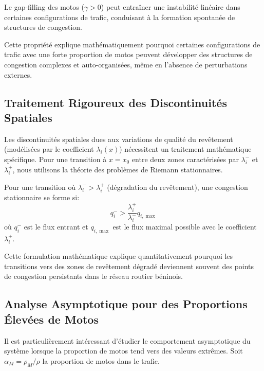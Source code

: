 \begin{proposition}
Le gap-filling des motos ($\gamma > 0$) peut entraîner une instabilité linéaire dans certaines configurations de trafic, conduisant à la formation spontanée de structures de congestion.
\end{proposition}

Cette propriété explique mathématiquement pourquoi certaines configurations de trafic avec une forte proportion de motos peuvent développer des structures de congestion complexes et auto-organisées, même en l'absence de perturbations externes.

\subsection{Traitement Rigoureux des Discontinuités Spatiales}
\label{subsec:traitement_discontinuites}

Les discontinuités spatiales dues aux variations de qualité du revêtement (modélisées par le coefficient $\lambda_i(x)$) nécessitent un traitement mathématique spécifique. Pour une transition à $x = x_0$ entre deux zones caractérisées par $\lambda_i^-$ et $\lambda_i^+$, nous utilisons la théorie des problèmes de Riemann stationnaires.

\begin{theorem}
Pour une transition où $\lambda_i^- > \lambda_i^+$ (dégradation du revêtement), une congestion stationnaire se forme si:
\begin{equation}
q_i^- > \frac{\lambda_i^+}{\lambda_i^-} q_{i,\max}
\end{equation}
où $q_i^-$ est le flux entrant et $q_{i,\max}$ est le flux maximal possible avec le coefficient $\lambda_i^+$.
\end{theorem}

Cette formulation mathématique explique quantitativement pourquoi les transitions vers des zones de revêtement dégradé deviennent souvent des points de congestion persistants dans le réseau routier béninois.

\subsection{Analyse Asymptotique pour des Proportions Élevées de Motos}
\label{subsec:analyse_asymptotique}

Il est particulièrement intéressant d'étudier le comportement asymptotique du système lorsque la proportion de motos tend vers des valeurs extrêmes. Soit $\alpha_M = \rho_M/\rho$ la proportion de motos dans le trafic.

